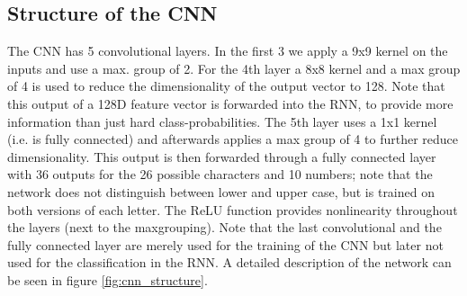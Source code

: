 \documentclass{utue} %
\begin{document}
\subsection{Structure of the CNN}
The CNN has 5 convolutional layers. In the first 3 we apply a 9x9 kernel on the inputs and use a max. group of 2. For the 4th layer a 8x8 kernel and a max group of 4 is used to reduce the dimensionality of the output vector to 128. Note that this output of a 128D feature vector is forwarded into the RNN, to provide more information than just hard class-probabilities. The 5th layer uses a 1x1 kernel %
(i.e. is fully connected) and afterwards applies a max group of 4 to further reduce dimensionality. This output is then forwarded through a fully connected layer with 36 outputs for the 26 possible characters and 10 numbers; note that the network does not distinguish between lower and upper case, but is trained on both versions of each letter. The ReLU function provides nonlinearity throughout the layers (next to the maxgrouping). Note that the last convolutional and the fully connected layer are merely used for the training of the CNN but later not used for the classification in the RNN. A detailed description of the network can be seen in figure \ref{fig:cnn_structure}.
\end{document}

